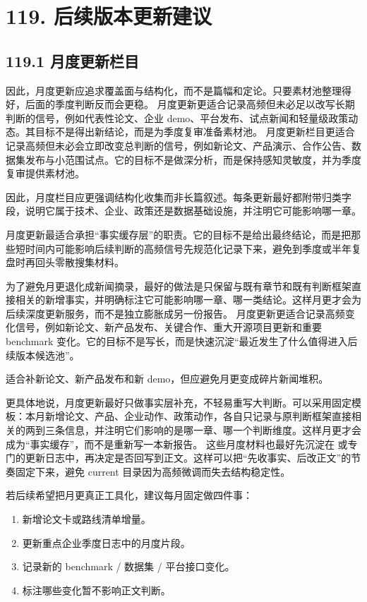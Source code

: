 \section*{119. 后续版本更新建议}

\subsection*{119.1 月度更新栏目}


因此，月度更新应追求覆盖面与结构化，而不是篇幅和定论。只要素材池整理得好，后面的季度判断反而会更稳。 月度更新更适合记录高频但未必足以改写长期判断的信号，例如代表性论文、企业 demo、平台发布、试点新闻和轻量级政策动态。其目标不是得出新结论，而是为季度复审准备素材池。 月度更新栏目更适合记录高频但未必会立即改变总判断的信号，例如新论文、产品演示、合作公告、数据集发布与小范围试点。它的目标不是做深分析，而是保持感知灵敏度，并为季度复审提供素材池。

因此，月度栏目应更强调结构化收集而非长篇叙述。每条更新最好都附带归类字段，说明它属于技术、企业、政策还是数据基础设施，并注明它可能影响哪一章。

月度更新最适合承担“事实缓存层”的职责。它的目标不是给出最终结论，而是把那些短时间内可能影响后续判断的高频信号先规范化记录下来，避免到季度或半年复盘时再回头零散搜集材料。

为了避免月更退化成新闻摘录，最好的做法是只保留与既有章节和既有判断框架直接相关的新增事实，并明确标注它可能影响哪一章、哪一类结论。这样月更才会为后续深度更新服务，而不是独立膨胀成另一份报告。 月度更新更适合记录高频变化信号，例如新论文、新产品发布、关键合作、重大开源项目更新和重要 benchmark 变化。它的目标不是写长，而是快速沉淀“最近发生了什么值得进入后续版本候选池”。

适合补新论文、新产品发布和新 demo，但应避免月更变成碎片新闻堆积。

更具体地说，月度更新最好只做事实层补充，不轻易重写大判断。可以采用固定模板：本月新增论文、产品、企业动作、政策动作，各自只记录与原判断框架直接相关的两到三条信息，并注明它们影响的是哪一章、哪一个判断维度。这样月更才会成为“事实缓存”，而不是重新写一本新报告。 这些月度材料也最好先沉淀在  或专门的更新日志中，再决定是否回写到正文。这样可以把“先收事实、后改正文”的节奏固定下来，避免 current 目录因为高频微调而失去结构稳定性。

若后续希望把月更真正工具化，建议每月固定做四件事：

\begin{enumerate}
\item 新增论文卡或路线清单增量。
\item 更新重点企业季度日志中的月度片段。
\item 记录新的 benchmark / 数据集 / 平台接口变化。
\item 标注哪些变化暂不影响正文判断。
\end{enumerate}

